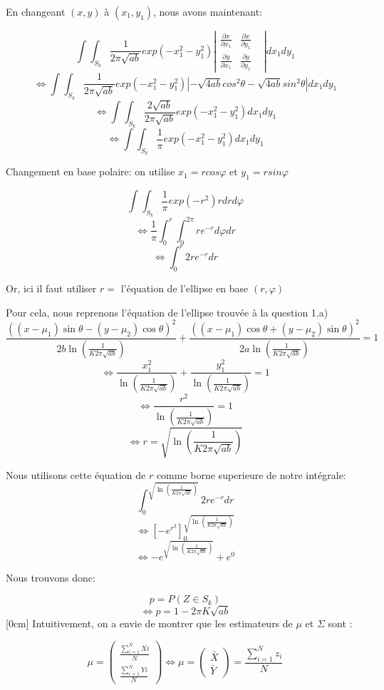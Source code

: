 \documentclass{article}
\begin{document}
En changeant $(x,y)$ à $(x_1,y_1)$, nous avons maintenant:

$$\int\int_{S_k}^{} \frac{1}{2\pi\sqrt{ab}}exp(-x_1^2-y_1^2)\left| \begin{matrix}\frac{\partial x}{\partial x_1}
    &  \frac{\partial x}{\partial y_1}
    &  \\\frac{\partial y}{\partial x_1}
    & \frac{\partial y}{\partial y_1}
\end{matrix} \right|dx_1dy_1$$
$$\Leftrightarrow \int\int_{S_k}^{} \frac{1}{2\pi\sqrt{ab}}exp(-x_1^2-y_1^2)\left| -\sqrt{4ab}cos^2\theta -\sqrt{4ab}sin^2\theta\right|dx_1dy_1$$
$$\Leftrightarrow \int\int_{S_k}^{} \frac{2\sqrt{ab}}{2\pi\sqrt{ab}}exp(-x_1^2-y_1^2)dx_1dy_1$$
$$\Leftrightarrow \int\int_{S_k}^{} \frac{1}{\pi}exp(-x_1^2-y_1^2)dx_1dy_1$$

Changement en base polaire: on utilise $x_1=rcos\varphi$ et $y_1=rsin\varphi$

$$\int\int_{S_k}^{} \frac{1}{\pi}exp(-r^2)rdrd\varphi$$
$$\Leftrightarrow \frac{1}{\pi}\int_{0}^{r}\int_{0}^{2\pi} re^{-r}d\varphi dr$$
$$\Leftrightarrow \int_{0}^{r} 2re^{-r} dr$$

Or, ici il faut utiliser $r=$ l'équation de l'ellipse en base $(r,\varphi)$

Pour cela, nous reprenons l'équation de l'ellipse trouvée à la question 1.a)
$$\frac{((x-\mu_1)\sin\theta-(y-\mu_2)\cos\theta)^{2}}{2b\ln(\frac{1}{K2\pi\sqrt{ab}})}+\frac{((x-\mu_1)\cos\theta+(y-\mu_2)\sin\theta)^{2}}{2a\ln(\frac{1}{K2\pi\sqrt{ab}})}=1$$
$$\Leftrightarrow \frac{x_1^2}{\ln(\frac{1}{K2\pi\sqrt{ab}})}+\frac{y_1^2}{\ln(\frac{1}{K2\pi\sqrt{ab}})}=1$$
$$\Leftrightarrow \frac{r^2}{\ln(\frac{1}{K2\pi\sqrt{ab}})}=1$$
$$\Leftrightarrow r=\sqrt{\ln(\frac{1}{K2\pi\sqrt{ab}})}$$

Nous utilisons cette équation de $r$ comme borne superieure de notre intégrale:
$$\int_{0}^{\sqrt{\ln(\frac{1}{K2\pi\sqrt{ab}})}} 2re^{-r} dr$$
$$\Leftrightarrow \left[ -e^{r^2} \right]_{0}^{\sqrt{\ln(\frac{1}{K2\pi\sqrt{ab}})}}$$
$$\Leftrightarrow -e^{\sqrt{\ln(\frac{1}{K2\pi\sqrt{ab}})}}+e^0$$

Nous trouvons donc:

$$p=P(Z \in S_k)$$
$$\Leftrightarrow p=1-2\pi K\sqrt{ab}$$
\clearpage
\reversemarginpar{}[0cm]
Intuitivement, on a envie de montrer que les estimateurs de $\mu$ et $\Sigma$ sont :

\[
\mu = \begin{pmatrix} \frac{\sum_{i=1}^{N}Xi}{N} \\ \frac{\sum_{i=1}^{N}Yi}{N} \end{pmatrix} \Leftrightarrow \mu = \begin{pmatrix} \bar{X} \\ \bar{Y} \end{pmatrix} = \frac{\sum_{i=1}^{N}z_i}{N}
\]
\end{document}
